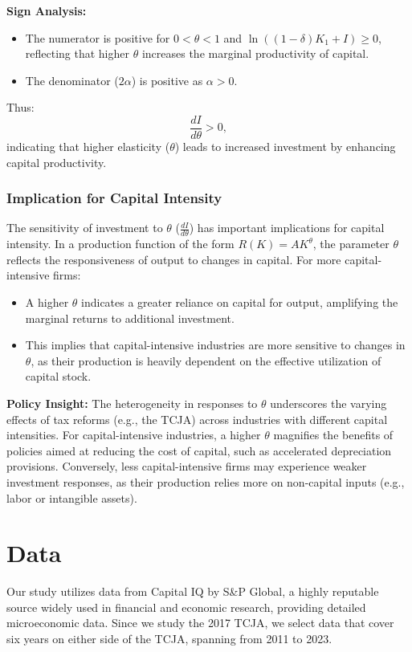 \documentclass[11pt]{article}
\begin{document}
\noindent \textbf{Sign Analysis:}
\begin{itemize}
    \item The numerator is positive for \( 0 < \theta < 1 \) and \( \ln \left((1 - \delta) K_1 + I\right) \geq 0 \), reflecting that higher \(\theta\) increases the marginal productivity of capital.
    \item The denominator (\( 2\alpha \)) is positive as \(\alpha > 0\).
\end{itemize}
Thus:
$$
\frac{dI}{d\theta} > 0,
$$
indicating that higher elasticity (\( \theta \)) leads to increased investment by enhancing capital productivity.

\subsubsection*{Implication for Capital Intensity}

The sensitivity of investment to \(\theta\) (\( \frac{dI}{d\theta} \)) has important implications for capital intensity. In a production function of the form \( R(K) = A K^\theta \), the parameter \(\theta\) reflects the responsiveness of output to changes in capital. For more capital-intensive firms:
\begin{itemize}
    \item A higher \(\theta\) indicates a greater reliance on capital for output, amplifying the marginal returns to additional investment.
    \item This implies that capital-intensive industries are more sensitive to changes in \(\theta\), as their production is heavily dependent on the effective utilization of capital stock.
\end{itemize}

\noindent \textbf{Policy Insight:} The heterogeneity in responses to \(\theta\) underscores the varying effects of tax reforms (e.g., the TCJA) across industries with different capital intensities. For capital-intensive industries, a higher \(\theta\) magnifies the benefits of policies aimed at reducing the cost of capital, such as accelerated depreciation provisions. Conversely, less capital-intensive firms may experience weaker investment responses, as their production relies more on non-capital inputs (e.g., labor or intangible assets).



\section{Data}
Our study utilizes data from Capital IQ by S\&P Global, a highly reputable source widely used in financial and economic research, providing detailed microeconomic data. Since we study the 2017 TCJA, we select data that cover six years on either side of the TCJA, spanning from 2011 to 2023.
\end{document}
